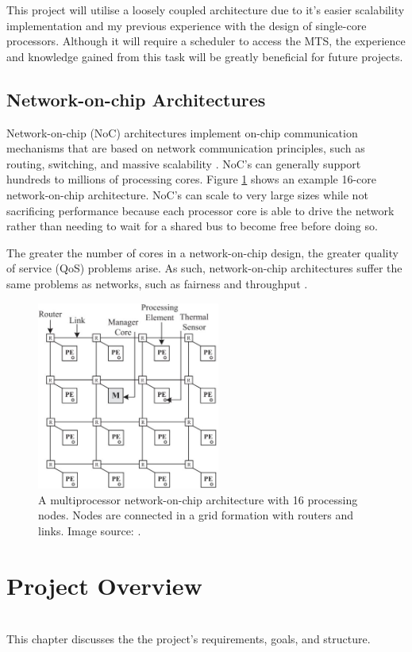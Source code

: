 \documentclass[11pt,a4paper]{report}
\begin{document}
{This project will utilise a loosely coupled architecture due to it's easier scalability implementation and my previous experience with the design of single-core processors. Although it will require a scheduler to access the MTS, the experience and knowledge gained from this task will be greatly beneficial for future projects.

\section{Network-on-chip Architectures}
Network-on-chip (NoC) architectures implement on-chip communication mechanisms that are based on network communication  principles, such as routing, switching, and massive scalability \cite{newnoc}. NoC's can generally support hundreds to millions of processing cores.
Figure \ref{fig:noc} shows an example 16-core network-on-chip architecture. 
NoC's can scale to very large sizes while not sacrificing performance because each processor core is able to drive the network rather than needing to wait for a shared bus to become free before doing so.

The greater the number of cores in a network-on-chip design, the greater quality of service (QoS) problems arise. As such, network-on-chip architectures suffer the same problems as networks, such as fairness and throughput \cite{nocfairness}.


\begin{figure}[h]
\centering
\includegraphics[width=6cm]{../img/noc}
\caption{A multiprocessor network-on-chip architecture with 16 processing nodes. Nodes are connected in a grid formation with routers and links. Image source: \cite{noc}.}
\label{fig:noc}
\end{figure}

\chapter{Project Overview}
{%
\startcontents[chapters]
}
\noindent\\
This chapter discusses the the project's requirements, goals, and structure.

}
\end{document}
